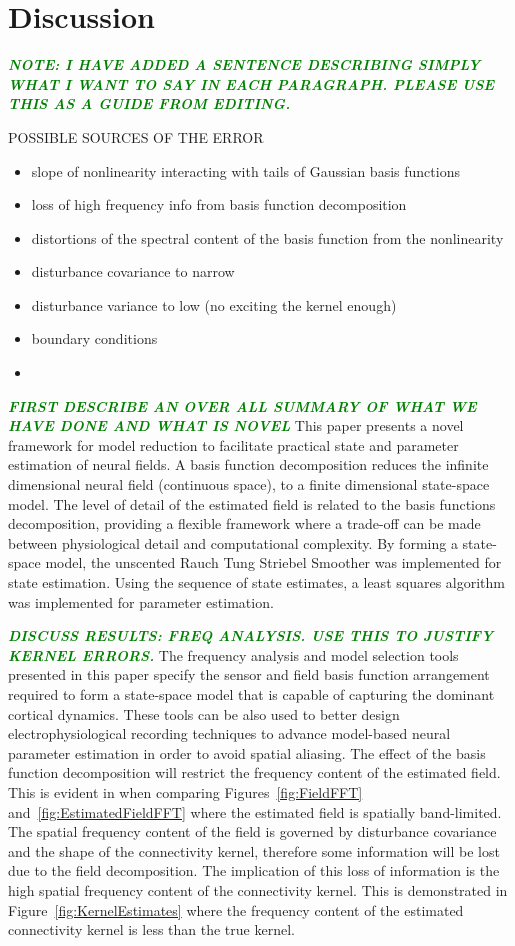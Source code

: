 \documentclass[12pt]{iopart}
\newcommand{\omg}[1]{\textsf{\emph{\textbf{\textcolor{green}{#1}}}}}
\begin{document}
\section{Discussion}\label{DiscussionSection}

\omg{NOTE: I HAVE ADDED A SENTENCE DESCRIBING SIMPLY WHAT I WANT TO SAY IN EACH PARAGRAPH. PLEASE USE THIS AS A GUIDE FROM EDITING.}

POSSIBLE SOURCES OF THE ERROR
\begin{itemize}
	\item slope of nonlinearity interacting with tails of Gaussian basis functions
	\item loss of high frequency info from basis function decomposition
	\item distortions of the spectral content of the basis function from the nonlinearity
	\item disturbance covariance to narrow
	\item disturbance variance to low (no exciting the kernel enough)
	\item boundary conditions
	\item
\end{itemize}

\omg{FIRST DESCRIBE AN OVER ALL SUMMARY OF WHAT WE HAVE DONE AND WHAT IS NOVEL}
This paper presents a novel framework for model reduction to facilitate practical state and parameter estimation of neural fields. A basis function decomposition reduces the infinite dimensional neural field (continuous space), to a finite dimensional state-space model. The level of detail of the estimated field is related to the basis functions decomposition, providing a flexible framework where a trade-off can be made between physiological detail and computational complexity. By forming a state-space model, the unscented Rauch Tung Striebel Smoother was implemented for state estimation. Using the sequence of state estimates, a least squares algorithm was implemented for parameter estimation.  

\omg{DISCUSS RESULTS: FREQ ANALYSIS. USE THIS TO JUSTIFY KERNEL ERRORS.}
The frequency analysis and model selection tools presented in this paper specify the sensor and field basis function arrangement required to form a state-space model that is capable of capturing the dominant cortical dynamics. These tools can be also used to better design electrophysiological recording techniques to advance model-based neural parameter estimation in order to avoid spatial aliasing. The effect of the basis function decomposition will restrict the frequency content of the estimated field. This is evident in when comparing Figures~\ref{fig:FieldFFT} and~\ref{fig:EstimatedFieldFFT} where the estimated field is spatially band-limited. The spatial frequency content of the field is governed by disturbance covariance and the shape of the connectivity kernel, therefore some information will be lost due to the field decomposition. The implication of this loss of information is the high spatial frequency content of the connectivity kernel. This is demonstrated in Figure~\ref{fig:KernelEstimates} where the frequency content of the estimated connectivity kernel is less than the true kernel.
\end{document}
